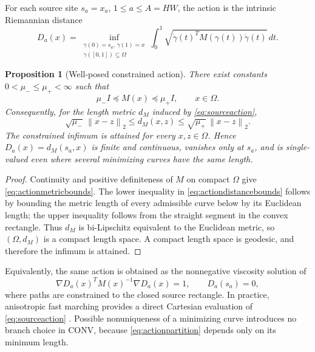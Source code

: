 \documentclass[journal]{IEEEtran}
\newtheorem{proposition}{Proposition}
\newcommand{\norm}[1]{\left\lVert#1\right\rVert}
\begin{document}
For each source site \(s_a=x_a\), \(1\leq a\leq A=HW\), the action is the
intrinsic Riemannian distance
\begin{equation}
 D_a(x)=\inf_{\substack{\gamma(0)=s_a,\,\gamma(1)=x\\
                        \gamma([0,1])\subseteq\Omega}}
 \int_0^1\sqrt{\dot\gamma(t)^TM(\gamma(t))\dot\gamma(t)}\,dt.
 \label{eq:sourceaction}
\end{equation}
\begin{proposition}[Well-posed constrained action]
There exist constants \(0<\mu_-\leq\mu_+<\infty\) such that
\begin{equation}
 \mu_-I\preceq M(x)\preceq\mu_+I,\qquad x\in\Omega.
 \label{eq:actionmetricbounds}
\end{equation}
Consequently, for the length metric \(d_M\) induced by
\eqref{eq:sourceaction},
\begin{equation}
 \sqrt{\mu_-}\,\norm{x-z}_2
 \leq d_M(x,z)
 \leq \sqrt{\mu_+}\,\norm{x-z}_2 .
 \label{eq:actiondistancebounds}
\end{equation}
The constrained infimum is attained for every \(x,z\in\Omega\). Hence
\(D_a(x)=d_M(s_a,x)\) is finite and continuous, vanishes only at \(s_a\),
and is single-valued even where several minimizing curves have the same
length.
\end{proposition}

\begin{proof}
Continuity and positive definiteness of \(M\) on compact \(\Omega\) give
\eqref{eq:actionmetricbounds}. The lower inequality in
\eqref{eq:actiondistancebounds} follows by bounding the metric length of
every admissible curve below by its Euclidean length; the upper inequality
follows from the straight segment in the convex rectangle. Thus \(d_M\) is
bi-Lipschitz equivalent to the Euclidean metric, so \((\Omega,d_M)\) is a
compact length space. A compact length space is geodesic, and therefore the
infimum is attained.
\end{proof}

Equivalently, the same action is obtained as the nonnegative viscosity
solution of
\begin{equation}
 \nabla D_a(x)^TM(x)^{-1}\nabla D_a(x)=1,
 \qquad D_a(s_a)=0,
 \label{eq:eikonalpde}
\end{equation}
where paths are constrained to the closed source rectangle. In practice,
anisotropic fast marching provides a direct Cartesian evaluation of
\eqref{eq:sourceaction} \cite{mirebeau2014}.
Possible nonuniqueness of a minimizing curve introduces no branch choice in
CONV, because \eqref{eq:actionpartition} depends only on its minimum length.
\end{document}
